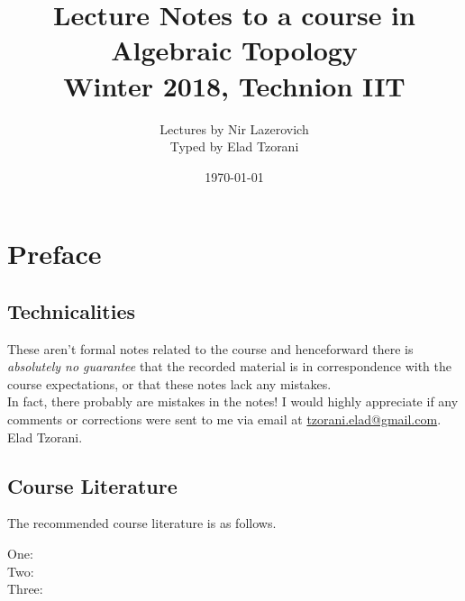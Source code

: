 \documentclass[10pt,a4paper,twoside,openany,hidelinks]{book}
\title{Lecture Notes to a course in Algebraic Topology \\ \large{Winter 2018, Technion IIT}}
\author{Lectures by Nir Lazerovich \\ \large Typed by Elad Tzorani}
\date{\today}
\begin{document}
\frontmatter
{}
\tableofcontents
\countlectures
\newpage

\chapter*{Preface}
 

\section*{Technicalities}

These aren't formal notes related to the course and henceforward there is \emph{absolutely no guarantee} that the recorded material is in correspondence with the course expectations, or that these notes lack any mistakes.\\
In fact, there probably are mistakes in the notes! I would highly appreciate if any comments or corrections were sent to me via email at \href{mailto:tzorani.elad@gmail.com}{tzorani.elad@gmail.com}.\\
Elad Tzorani.

\section*{Course Literature}

The recommended course literature is as follows.
\begin{description}
\item[One:]

\item[Two:]

\item[Three:]
\end{description}

\mainmatter


\backmatter
\end{document}

